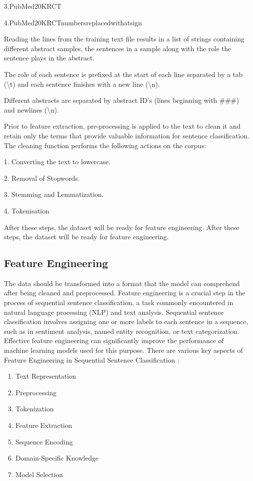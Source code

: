 \documentclass[12pt,a4paper]{report}     %
\begin{document}
\begin{normalsize}
{3.PubMed\textunderscore20K\textunderscore RCT

4.PubMed\textunderscore20K\textunderscore RCT\textunderscore numbers\textunderscore replaced\textunderscore with\textunderscore at\textunderscore sign

Reading the lines from the training text file results in a list of strings containing different abstract samples, the sentences in a sample along with the role the sentence plays in the abstract.

The role of each sentence is prefixed at the start of each line separated by a tab (\textbackslash t) and each sentence finishes with a new line (\textbackslash n).

Different abstracts are separated by abstract ID's (lines beginning with \#\#\#) and newlines (\textbackslash n).

Prior to feature extraction, pre-processing is applied to the text to clean it and retain only the terms that provide valuable information for sentence classification. The cleaning function performs the following actions on the corpus:

1. Converting the text to lowercase.

2. Removal of Stopwords.

3. Stemming and Lemmatization. 

4. Tokenisation

After these steps, the dataset will be ready for feature engineering. 
After these steps, the dataset will be ready for feature engineering. 
\subsection{Feature Engineering}
The data should be transformed into a format that the
model can comprehend after being cleaned and preprocessed.
Feature engineering is a crucial step in the process of sequential sentence classification, a task commonly encountered in natural language processing (NLP) and text analysis. Sequential sentence classification involves assigning one or more labels to each sentence in a sequence, such as in sentiment analysis, named entity recognition, or text categorization. Effective feature engineering can significantly improve the performance of machine learning models used for this purpose.
There are various key aspects of Feature Engineering in Sequential Sentence Classification : 
\begin{enumerate}
    \item Text Representation
    \item Preprocessing
    \item Tokenization
    \item Feature Extraction
    \item Sequence Encoding
    \item Domain-Specific Knowledge
    \item Model Selection
\end{enumerate}

}
\end{normalsize}
\end{document}
